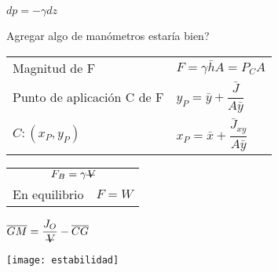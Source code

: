 \documentclass[11pt,a4paper]{article}
\newcommand{\vdes}{\st{\textsl{V}}}
\begin{document}
		\begin{cajita}
			\centering
			$dp = -\gamma dz$
			
			Agregar algo de manómetros estaría bien?
			
			
			\begin{tabular}{l l}
				Magnitud de F & $F = \gamma \bar{h} A = P_C A$\\
				Punto de aplicación C de F & $ y_P = \bar{y} + \dfrac{\bar{J}}{A \bar{y}}$\\
				$C:(x_P, y_P)$& $x_P = \bar{x} + \dfrac{\bar{J}_{xy}}{A \bar{y}}$\\
			\end{tabular}
		
			
		\begin{multicols}{2}
			\begin{tabular}{l l}
				\multicolumn{2}{c}{$F_B = \gamma \vdes$}\\
				En equilibrio & $F=W$\\
			\end{tabular}
		
			\columnbreak
			
			
			$\overline{GM} = \dfrac{J_O}{\vdes} - \overline{CG}$
			
			
			\texttt{[image: estabilidad]}
		\end{multicols}
		\end{cajita}
\end{document}
